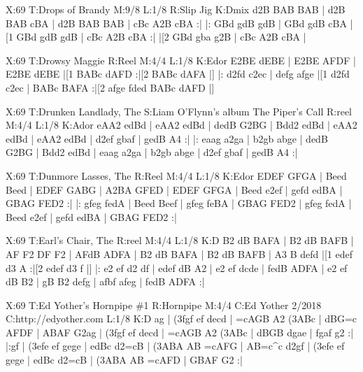 \documentclass[letterpaper]{article}
\begin{document}
\begin{abc}[name]
X:69
T:Drops of Brandy
M:9/8
L:1/8
R:Slip Jig
K:Dmix
d2B BAB BAB | d2B BAB cBA | d2B BAB BAB | cBc A2B cBA :|
|: GBd gdB gdB | GBd gdB cBA |[1 GBd gdB gdB | cBc A2B cBA :|
|[2 GBd gba g2B | cBc A2B cBA |
\end{abc}

\begin{abc}[name]
X:69
T:Drowsy Maggie
R:Reel
M:4/4
L:1/8
K:Edor
E2BE dEBE | E2BE AFDF | E2BE dEBE |[1 BABc dAFD :|[2 BABc dAFA |]
|: d2fd c2ec | defg afge |[1 d2fd c2ec | BABc BAFA :|[2 afge fded BABc dAFD |]
\end{abc}

\begin{abc}[name]
X:69
T:Drunken Landlady, The
S:Liam O'Flynn's album The Piper's Call
R:reel
M:4/4
L:1/8
K:Ador
eAA2 edBd | eAA2 edBd | dedB G2BG | Bdd2 edBd |
eAA2 edBd | eAA2 edBd | d2ef gbaf | gedB A4 :|
|: eaag a2ga | b2gb abge | dedB G2BG | Bdd2 edBd |
eaag a2ga | b2gb abge | d2ef gbaf | gedB A4 :|
\end{abc}

\begin{abc}[name]
X:69
T:Dunmore Lasses, The
R:Reel
M:4/4
L:1/8
K:Edor
EDEF GFGA | Beed Beed | EDEF GABG | A2BA GFED |
EDEF GFGA | Beed e2ef | gefd edBA | GBAG FED2 :|
|: gfeg fedA | Beed Beef | gfeg feBA | GBAG FED2 |
gfeg fedA | Beed e2ef | gefd edBA | GBAG FED2 :|
\end{abc}

\begin{abc}[name]
X:69
T:Earl's Chair, The
R:reel
M:4/4
L:1/8
K:D
B2 dB BAFA | B2 dB BAFB | AF F2 DF F2 | AFdB ADFA |
B2 dB BAFA | B2 dB BAFB | A3 B defd |[1 edef d3 A :|[2 edef d3 f |]
|: e2 ef d2 df | edef dB A2 | e2 ef dcde | fedB ADFA |
e2 ef dB B2 | gB B2 defg | afbf afeg | fedB ADFA :|
\end{abc}

\begin{abc}[name]
X:69
T:Ed Yother's Hornpipe \#1
R:Hornpipe
M:4/4
C:Ed Yother 2/2018
C:http://edyother.com
L:1/8
K:D
ag | (3fgf ef decd | =cAGB A2 (3ABc | dBG=c AFDF | ABAF G2ag |
(3fgf ef decd | =cAGB A2 (3ABc | dBGB dgae | fgaf g2 :|
|:gf | (3efe ef gege | edBc d2=cB | (3ABA AB =cAFG | AB=c^c d2gf |
(3efe ef gege | edBc d2=cB | (3ABA AB =cAFD | GBAF G2 :|
\end{abc}
\end{document}
